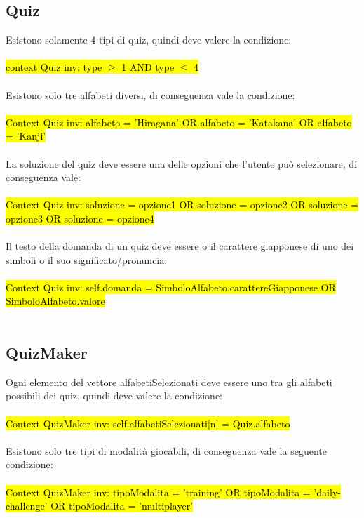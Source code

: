 \subsection{Quiz}
Esistono solamente 4 tipi di quiz, quindi deve valere la condizione: \\
\\
\hl{context Quiz inv: type $\geq$ 1 AND type $\leq$ 4} \\
\\
Esistono solo tre alfabeti diversi, di conseguenza vale la condizione: \\
\\
\hl{Context Quiz inv: alfabeto = 'Hiragana' OR alfabeto = 'Katakana' OR alfabeto = 'Kanji'} \\
\\
La soluzione del quiz deve essere una delle opzioni che l'utente può selezionare, di conseguenza vale: \\
\\
\hl{Context Quiz inv: soluzione = opzione1 OR soluzione = opzione2 OR soluzione = opzione3 OR soluzione = opzione4} \\
\\
Il testo della domanda di un quiz deve essere o il carattere giapponese di uno dei simboli o il suo significato/pronuncia: \\
\\
\hl{Context Quiz inv: self.domanda = SimboloAlfabeto.carattereGiapponese OR SimboloAlfabeto.valore} \\
\\

\subsection{QuizMaker}
Ogni elemento del vettore alfabetiSelezionati deve essere uno tra gli alfabeti possibili dei quiz, quindi deve valere la condizione: \\
\\
\hl{Context QuizMaker inv: self.alfabetiSelezionati[n] = Quiz.alfabeto} \\
\\
Esistono solo tre tipi di modalità giocabili, di conseguenza vale la seguente condizione: \\
\\
\hl{Context QuizMaker inv: tipoModalita = 'training' OR tipoModalita = 'daily-challenge' OR tipoModalita = 'multiplayer'} \\
\\

